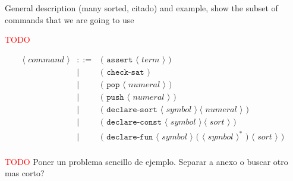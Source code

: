 General description (many sorted, citado) and example, show the subset of commands that we are going to use

\textcolor{red}{TODO}

\[
\begin{array}{rcll}
\langle\textit{ command }\rangle & ::= & \texttt{( assert } \langle\textit{ term }\rangle\texttt{ ) }\\
& | & \texttt{( check-sat )}\\
& | & \texttt{( pop } \langle\textit{ numeral }\rangle \texttt{ ) }\\
& | & \texttt{( push } \langle\textit{ numeral }\rangle \texttt{ ) }\\
& | & \texttt{( declare-sort } \langle\textit{ symbol }\rangle~\langle\textit{ numeral }\rangle\texttt{ ) }\\
& | & \texttt{( declare-const } \langle\textit{ symbol }\rangle~\langle\textit{ sort }\rangle\texttt{ ) }\\
& | & \texttt{( declare-fun } \langle\textit{ symbol }\rangle \texttt{ ( }\langle\textit{ symbol }\rangle^* \texttt{ ) }\langle\textit{ sort }\rangle\texttt{ ) }\\
\end{array}
\]

\textcolor{red}{TODO}
Poner un problema sencillo de ejemplo. Separar a anexo o buscar otro mas corto?

